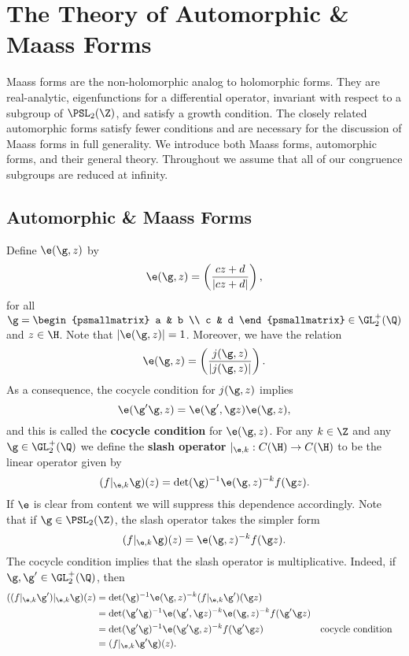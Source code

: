 \chapter{The Theory of Automorphic \& Maass Forms}
	Maass forms are the non-holomorphic analog to holomorphic forms. They are real-analytic, eigenfunctions for a differential operator, invariant with respect to a subgroup of $\PSL_{2}(\Z)$, and satisfy a growth condition. The closely related automorphic forms satisfy fewer conditions and are necessary for the discussion of Maass forms in full generality. We introduce both Maass forms, automorphic forms, and their general theory. Throughout we assume that all of our congruence subgroups are reduced at infinity.
  \section{Automorphic \& Maass Forms}
    Define $\e(\g,z)$ by
    \[
      \e(\g,z) = \left(\frac{cz+d}{|cz+d|}\right),
    \]
    for all $\g = \begin{psmallmatrix} a & b \\ c & d \end{psmallmatrix} \in \GL_{2}^{+}(\Q)$ and $z \in \H$. Note that $|\e(\g,z)| = 1$. Moreover, we have the relation
    \[
      \e(\g,z) = \left(\frac{j(\g,z)}{|j(\g,z)|}\right).
    \]
    As a consequence, the cocycle condition for $j(\g,z)$ implies
    \[
      \e(\g'\g,z) =  \e(\g',\g z)\e(\g,z),
    \]
    and this is called the \textbf{cocycle condition} for $\e(\g,z)$. For any $k \in \Z$ and any $\g \in \GL_{2}^{+}(\Q)$ we define the \textbf{slash operator} $|_{\e,k}:C(\H) \to C(\H)$ to be the linear operator given by
    \[
      (f|_{\e,k}\g)(z) = \det(\g)^{-1}\e(\g,z)^{-k}f(\g z).
    \]
    If $\e$ is clear from content we will suppress this dependence accordingly. Note that if $\g \in \PSL_{2}(\Z)$, the slash operator takes the simpler form
    \[
      (f|_{\e,k}\g)(z) = \e(\g,z)^{-k}f(\g z).
    \]
    The cocycle condition implies that the slash operator is multiplicative. Indeed, if $\g,\g' \in \GL_{2}^{+}(\Q)$, then
    \begin{align*}
      ((f|_{\e,k}\g')|_{\e,k}\g)(z) &= \det(\g)^{-1}\e(\g,z)^{-k}(f|_{\e,k}\g')(\g z) \\
      &= \det(\g'\g)^{-1}\e(\g',\g z)^{-k}\e(\g,z)^{-k}f(\g'\g z) \\
      &= \det(\g'\g)^{-1}\e(\g'\g,z)^{-k}f(\g'\g z) && \text{cocycle condition} \\
      &= (f|_{\e,k}\g'\g)(z).
    \end{align*}
